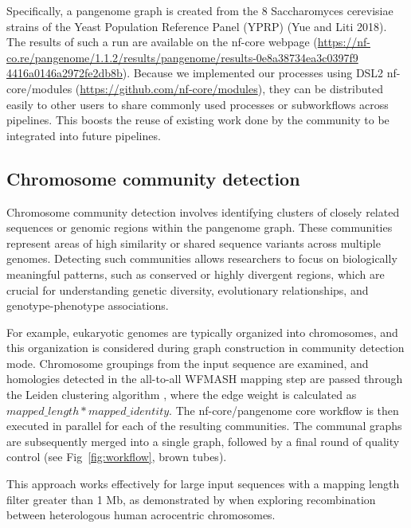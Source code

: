 \documentclass{bioinfo}
\theoremstyle{definition}
\begin{document}
	Specifically, a pangenome graph is created from the 8 Saccharomyces cerevisiae strains of the Yeast Population Reference Panel (YPRP) (Yue and Liti 2018). 
	The results of such a run are available on the nf-core webpage (\href{https://nf-co.re/pangenome/1.1.2/results/pangenome/results-0e8a38734ea3c0397f94416a0146a2972fe2db8b}{https://nf-co.re/pangenome/1.1.2/results/pangenome/results-0e8a38734ea3c0397f9\\4416a0146a2972fe2db8b}). 
	Because we implemented our processes using DSL2 nf-core/modules (\href{https://github.com/nf-core/modules}{https://github.com/nf-core/modules}), they can be distributed easily to other users to share commonly used processes or subworkflows across pipelines. This boosts the reuse of existing work done by the community to be integrated into future pipelines.
	
	\subsection{Chromosome community detection}
	\label{community}
	
	Chromosome community detection involves identifying clusters of closely related sequences or genomic regions within the pangenome graph. These communities represent areas of high similarity or shared sequence variants across multiple genomes. Detecting such communities allows researchers to focus on biologically meaningful patterns, such as conserved or highly divergent regions, which are crucial for understanding genetic diversity, evolutionary relationships, and genotype-phenotype associations.
	
	For example, eukaryotic genomes are typically organized into chromosomes, and this organization is considered during graph construction in community detection mode. Chromosome groupings from the input sequence are examined, and homologies detected in the all-to-all WFMASH mapping step are passed through the Leiden clustering algorithm \citep{Traag2019}, where the edge weight is calculated as $mapped\_length * mapped\_identity$. The nf-core/pangenome core workflow is then executed in parallel for each of the resulting communities. The communal graphs are subsequently merged into a single graph, followed by a final round of quality control (see Fig~\ref{fig:workflow}, brown tubes).
	
	This approach works effectively for large input sequences with a mapping length filter greater than 1 Mb, as demonstrated by \cite{Guarracino2023} when exploring recombination between heterologous human acrocentric chromosomes.
	
\end{document}
